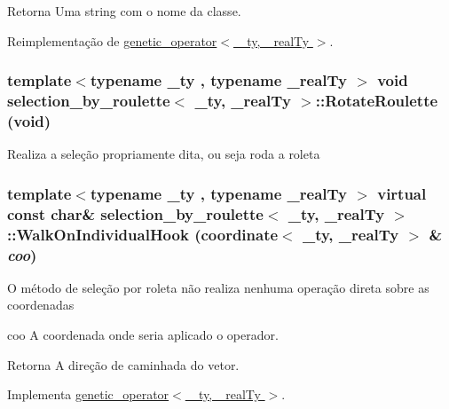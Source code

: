 \begin{DoxyReturn}{Retorna}
Uma string com o nome da classe. 
\end{DoxyReturn}


Reimplementação de \hyperlink{classgenetic__operator_ae0f79368c0b4ad0cff3f608727bd87f5}{genetic\_\-operator$<$ \_\-ty, \_\-realTy $>$}.

\hypertarget{classselection__by__roulette_ae19e7e752f54ab03983be567c8d10392}{
\subsubsection[{RotateRoulette}]{\setlength{\rightskip}{0pt plus 5cm}template$<$typename \_\-ty , typename \_\-realTy $>$ void {\bf selection\_\-by\_\-roulette}$<$ \_\-ty, \_\-realTy $>$::RotateRoulette (void)}}
\label{classselection__by__roulette_ae19e7e752f54ab03983be567c8d10392}
Realiza a seleção propriamente dita, ou seja roda a roleta \hypertarget{classselection__by__roulette_abb536fd7b63a452a2ebd8e7572bfc4d8}{
\subsubsection[{WalkOnIndividualHook}]{\setlength{\rightskip}{0pt plus 5cm}template$<$typename \_\-ty , typename \_\-realTy $>$ virtual const char\& {\bf selection\_\-by\_\-roulette}$<$ \_\-ty, \_\-realTy $>$::WalkOnIndividualHook ({\bf coordinate}$<$ \_\-ty, \_\-realTy $>$ \& {\em coo})}}
\label{classselection__by__roulette_abb536fd7b63a452a2ebd8e7572bfc4d8}
O método de seleção por roleta não realiza nenhuma operação direta sobre as coordenadas

coo A coordenada onde seria aplicado o operador.

\begin{DoxyReturn}{Retorna}
A direção de caminhada do vetor. 
\end{DoxyReturn}


Implementa \hyperlink{classgenetic__operator_a2124d70b28b35d3114eb3e3ffa72baef}{genetic\_\-operator$<$ \_\-ty, \_\-realTy $>$}.


